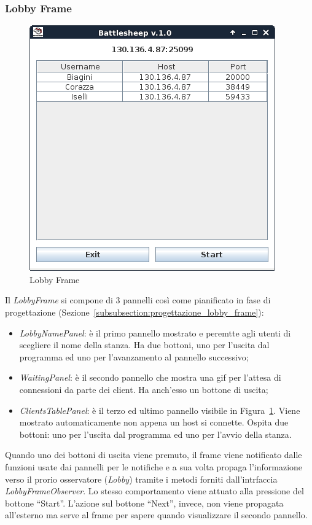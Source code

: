 \subsubsection{Lobby Frame}
\begin{figure}[!h]
	\centering
	\includegraphics[scale=0.5]{core/imgs/gui/lobby_frame}
	\caption{Lobby Frame}
	\label{figure:lobby_frame}
\end{figure}
Il \textit{LobbyFrame} si compone di 3 pannelli così come pianificato in fase di
progettazione (Sezione~\ref{subsubsection:progettazione_lobby_frame}):
\begin{itemize}
	\item \textit{LobbyNamePanel}: è il primo pannello mostrato e peremtte agli
	utenti di scegliere il nome della stanza. Ha due bottoni, uno per l'uscita
	dal programma ed uno per l'avanzamento al pannello successivo;
	\item \textit{WaitingPanel}: è il secondo pannello che mostra una gif per
	l'attesa di connessioni da parte dei client. Ha anch'esso un bottone di
	uscita;
	\item \textit{ClientsTablePanel}: è il terzo ed ultimo pannello visibile in
	Figura~\ref{figure:lobby_frame}. Viene mostrato automaticamente non appena
	un host si connette. Ospita due bottoni: uno per l'uscita dal programma ed
	uno per l'avvio della stanza.
\end{itemize}
Quando uno dei bottoni di uscita viene premuto, il frame viene notificato dalle
funzioni usate dai pannelli per le notifiche e a sua volta propaga
l'informazione verso il prorio osservatore (\textit{Lobby}) tramite i metodi
forniti dall'intrfaccia \textit{LobbyFrameObserver}. Lo stesso comportamento
viene attuato alla pressione del bottone ``Start''. L'azione sul bottone
``Next'', invece, non viene propagata all'esterno ma serve al frame per sapere
quando visualizzare il secondo pannello.



